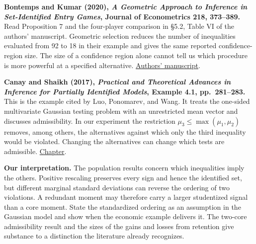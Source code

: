 \documentclass[12pt,letterpaper]{article}
\newcommand{\entry}[1]{\par\medskip{\large\bfseries #1}\par\nobreak}
\newcommand{\src}[2]{\href{#1}{#2}}
\begin{document}
\textbf{Bontemps and Kumar (2020), \emph{A Geometric Approach to Inference in Set-Identified Entry Games}, Journal of Econometrics 218, 373--389.}
Read Proposition 7 and the four-player comparison in \S5.2, Table VI of the authors' manuscript. Geometric selection reduces the number of inequalities evaluated from 92 to 18 in their example and gives the same reported confidence-region size. The size of a confidence region alone cannot tell us which procedure is more powerful at a specified alternative. \src{https://www.cemmap.ac.uk/wp-content/legacy/uploads/Bontemps-Kumar-JofEc-december2019.pdf}{Authors' manuscript}.

\entry{The connection to the normal experiment}
\textbf{Canay and Shaikh (2017), \emph{Practical and Theoretical Advances in Inference for Partially Identified Models}, Example 4.1, pp.~281--283.}
This is the example cited by Luo, Ponomarev, and Wang. It treats the one-sided multivariate Gaussian testing problem with an unrestricted mean vector and discusses admissibility. In our experiment the restriction $\mu_3\leq\max(\mu_1,\mu_2)$ removes, among others, the alternatives against which only the third inequality would be violated. Changing the alternatives can change which tests are admissible. \src{https://doi.org/10.1017/9781108227223.009}{Chapter}.

\textbf{Our interpretation.} The population results concern which inequalities imply the others. Positive rescaling preserves every sign and hence the identified set, but different marginal standard deviations can reverse the ordering of two violations. A redundant moment may therefore carry a larger studentized signal than a core moment. State the standardized ordering as an assumption in the Gaussian model and show when the economic example delivers it. The two-core admissibility result and the sizes of the gains and losses from retention give substance to a distinction the literature already recognizes.
\end{document}
